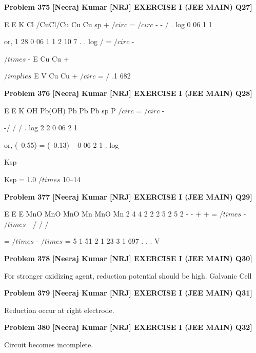 \begin{problembox}
\textbf{Problem 375} \hfill \textbf{[Neeraj Kumar [NRJ] EXERCISE I (JEE MAIN) Q27]}
\label{q:ext-nrj_all_questions-375}

E
E
K
Cl /CuCl/Cu
Cu
Cu
sp
+
$/circ$
=
$/circ$
-
-
/
.
log
0 06
1
1
 
 or, 1 28
0 06
1
1
2
10 7
.
.
log
/
=
$/circ$
-
 
$/times$
-
E Cu
Cu
+
 
 
$/implies$ E
V
Cu
Cu
+
$/circ$
=
/
.1 682
\end{problembox}

\begin{problembox}
\textbf{Problem 376} \hfill \textbf{[Neeraj Kumar [NRJ] EXERCISE I (JEE MAIN) Q28]}
\label{q:ext-nrj_all_questions-376}

E
E
K
OH
Pb(OH)
Pb
Pb
Pb
sp
P
$/circ$
=
$/circ$
-
 
-/
/
/
.
log
2
2
0 06
2
1
 
 or, (--0.55) = (--0.13) -- 0 06
2
1
.
log
 
Ksp
 
   Ksp = 1.0 $/times$ 10--14
\end{problembox}

\begin{problembox}
\textbf{Problem 377} \hfill \textbf{[Neeraj Kumar [NRJ] EXERCISE I (JEE MAIN) Q29]}
\label{q:ext-nrj_all_questions-377}

E
E
E
MnO
MnO
MnO
Mn
MnO
Mn
2
4
4
2
2
2
5
2
5
2
-
-
+
+
=
$/times$
-
$/times$
-
/
/
/
 
                      =
$/times$
-
$/times$
=
5 1 51
2
1 23
3
1 697
.
.
.
V
\end{problembox}

\begin{problembox}
\textbf{Problem 378} \hfill \textbf{[Neeraj Kumar [NRJ] EXERCISE I (JEE MAIN) Q30]}
\label{q:ext-nrj_all_questions-378}

For stronger oxidizing agent, reduction potential 
should be high.
Galvanic Cell
\end{problembox}

\begin{problembox}
\textbf{Problem 379} \hfill \textbf{[Neeraj Kumar [NRJ] EXERCISE I (JEE MAIN) Q31]}
\label{q:ext-nrj_all_questions-379}

Reduction occur at right electrode.
\end{problembox}

\begin{problembox}
\textbf{Problem 380} \hfill \textbf{[Neeraj Kumar [NRJ] EXERCISE I (JEE MAIN) Q32]}
\label{q:ext-nrj_all_questions-380}

Circuit becomes incomplete.
\end{problembox}

